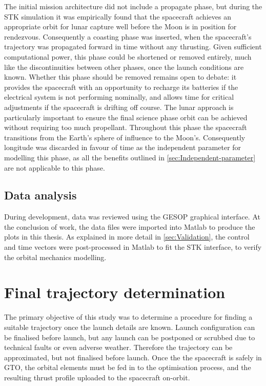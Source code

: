 The initial mission architecture did not include a propagate phase, but during the STK simulation it was empirically found that the spacecraft achieves an appropriate orbit for lunar capture well before the Moon is in position for rendezvous. Consequently a coasting phase was inserted, when the spacecraft's trajectory was propagated forward in time without any thrusting. Given sufficient computational power, this phase could be shortened or removed entirely, much like the discontinuities between other phases, once the launch conditions are known. Whether this phase should be removed remains open to debate: it provides the spacecraft with an opportunity to recharge its batteries if the electrical system is not performing nominally, and allows time for critical adjustments if the spacecraft is drifting off course. The lunar approach is particularly important to ensure the final science phase orbit can be achieved without requiring too much propellant. Throughout this phase the spacecraft transitions from the Earth's sphere of influence to the Moon's. Consequently longitude was discarded in favour of time as the independent parameter for modelling this phase, as all the benefits outlined in \autoref{sec:Independent-parameter} are not applicable to this phase.

\subsection{Data analysis} \label{sub:Data-analysis}

During development, data was reviewed using the GESOP graphical interface. At the conclusion of work, the data files were imported into Matlab to produce the plots in this thesis. As explained in more detail in \autoref{sec:Validation}, the control and time vectors were post-processed in Matlab to fit the STK interface, to verify the orbital mechanics modelling.



\section{Final trajectory determination} \label{sec:Method-application}

The primary objective of this study was to determine a procedure for finding a suitable trajectory once the launch details are known. Launch configuration can be finalised before launch, but any launch can be postponed or scrubbed due to technical faults or even adverse weather. Therefore the trajectory can be approximated, but not finalised before launch. Once the the spacecraft is safely in GTO, the orbital elements must be fed in to the optimisation process, and the resulting thrust profile uploaded to the spacecraft on-orbit.

